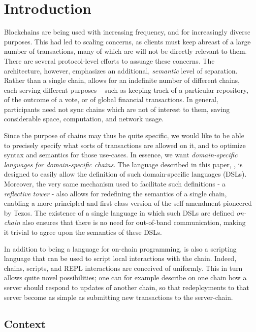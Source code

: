 \section{Introduction}
\label{s:introduction}

Blockchains are being used with increasing frequency, and for increasingly
diverse purposes. This had led to scaling concerns, as clients must keep
abreast of a large number of transactions, many of which are will not be
directly relevant to them. There are several protocol-level efforts to assuage
these concerns. The \oscoin{} architecture, however, emphasizes an additional,
\textit{semantic} level of separation. Rather than a single chain, \oscoin{}
allows for an indefinite number of different chains, each serving different
purposes -- such as keeping track of a particular repository, of the outcome of
a vote, or of global financial transactions. In general, participants need not
sync chains which are not of interest to them, saving considerable space,
computation, and network usage.

Since the purpose of chains may thus be quite specific, we would like to be
able to precisely specify what sorts of transactions are allowed on it, and to
optimize syntax and semantics for those use-cases. In essence, we want
\textit{domain-specific languages for domain-specific chains}. The language
described in this paper, \rad, is designed to easily allow the definition of
such domain-specific languages (DSLs). Moreover, the very same mechanism used to
facilitate such definitions - a \textit{reflective tower} - also
allows for redefining the semantics of a single chain, enabling a more
principled and first-class version of the self-amendment pioneered by
Tezos.\cite{Goodman2014} The existence of a single language in which such DSLs
are defined \textit{on-chain} also ensures that there is no need for
out-of-band communication, making it trivial to agree upon the semantics of
these DSLs.

In addition to being a language for on-chain programming, \rad is also a
scripting language that can be used to script local interactions with the
chain. Indeed, chains, scripts, and REPL interactions are conceived of
uniformly. This in turn allows quite novel possibilities; one can for
example describe on one chain how a server should respond to updates of another
chain, so that redeployments to that server become as simple as submitting new
transactions to the server-chain.

\subsection{Context}

